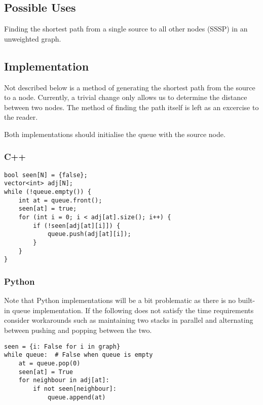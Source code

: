 \documentclass{article}
\begin{document}
\subsection{Possible Uses}
Finding the shortest path from a single source to all other nodes (SSSP) in an unweighted graph.
\subsection{Implementation}
Not described below is a method of generating the shortest path from the source to a node. Currently, a trivial change only allows us to determine the distance between two nodes. The method of finding the path itself is left as an excercise to the reader.

\noindent Both implementations should initialise the queue with the source node.
\subsubsection{C++}
\begin{verbatim}
bool seen[N] = {false};
vector<int> adj[N];
while (!queue.empty()) {
    int at = queue.front();
    seen[at] = true;
    for (int i = 0; i < adj[at].size(); i++) {
        if (!seen[adj[at][i]]) {
            queue.push(adj[at][i]);
        }
    }
}
\end{verbatim}
\subsubsection{Python}
Note that Python implementations will be a bit problematic as there is no built-in queue implementation. If the following does not satisfy the time requirements consider workarounds such as maintaining two stacks in parallel and alternating between pushing and popping between the two.
\begin{verbatim}
seen = {i: False for i in graph}
while queue:  # False when queue is empty
    at = queue.pop(0)
    seen[at] = True
    for neighbour in adj[at]:
        if not seen[neighbour]:
            queue.append(at) 
\end{verbatim}
\end{document}
